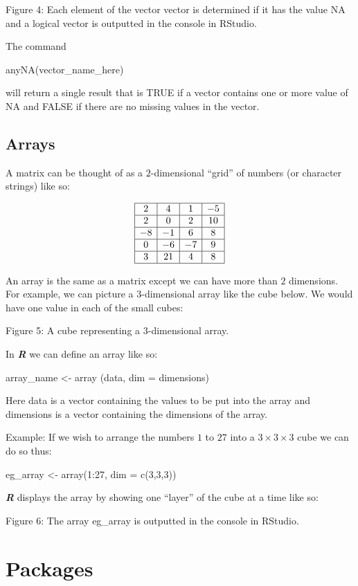\documentclass[
]{book}
\begin{document}
Figure 4: Each element of the vector vector is determined if it has the value NA and a logical vector is outputted in the console in RStudio.

The command

anyNA(vector\_name\_here)

will return a single result that is TRUE if a vector contains one or more value of NA and FALSE if there are no missing values in the vector.

\section{Arrays}\label{arrays}

A matrix can be thought of as a \(2\)-dimensional ``grid'' of numbers (or character strings) like so:

\[ \begin{array}{|c|c|c|c|}
\hline
2 & 4 & 1 & -5 \\ \hline
2 & 0 & 2 & 10 \\ \hline
-8 & -1 & 6 & 8 \\ \hline
0 & -6 & -7 & 9 \\ \hline
3 & 21 & 4 & 8 \\ \hline
\end{array}  \]

An array is the same as a matrix except we can have more than \(2\) dimensions. For example, we can picture a \(3\)-dimensional array like the cube below. We would have one value in each of the small cubes:

Figure 5: A cube representing a \(3\)-dimensional array.

In \textbf{\emph{R}} we can define an array like so:

array\_name \textless- array (data, dim = dimensions)

Here data is a vector containing the values to be put into the array and dimensions is a vector containing the dimensions of the array.

Example: If we wish to arrange the numbers \(1\) to \(27\) into a \(3 \times 3 \times 3\) cube we can do so thus:

eg\_array \textless- array(1:27, dim = c(3,3,3))

\textbf{\emph{R}} displays the array by showing one ``layer'' of the cube at a time like so:

Figure 6: The array eg\_array is outputted in the console in RStudio.

\chapter{Packages}\label{packages}
\end{document}
